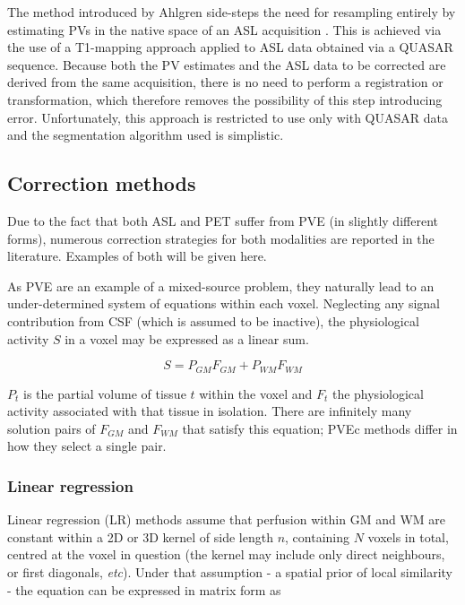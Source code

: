 \documentclass[12pt]{report}
\providecommand{\DIFaddend}{} %
\DeclareRobustCommand{\DIFaddend}{\DIFOaddend \let\includegraphics\DIFOincludegraphics} %
\begin{document}
\DIFaddend The method introduced by Ahlgren side-steps the need for resampling entirely by estimating PVs in the native space of an ASL acquisition \cite{Ahlgren2014}. This is achieved via the use of a T1-mapping approach applied to ASL data obtained via a QUASAR sequence. Because both the PV estimates and the ASL data to be corrected are derived from the same acquisition, there is no need to perform a registration or transformation, which therefore removes the possibility of this step introducing error. Unfortunately, this approach is restricted to use only with QUASAR data and the segmentation algorithm used is simplistic. 

\subsection{Correction methods}

Due to the fact that both ASL and PET suffer from PVE (in slightly different forms), numerous correction strategies for both modalities are reported in the literature. Examples of both will be given here. 

As PVE are an example of a mixed-source problem, they naturally lead to an under-determined system of equations within each voxel. Neglecting any signal contribution from CSF (which is assumed to be inactive), the physiological activity $S$ in a voxel may be expressed as a linear sum. 

\begin{equation}
S = P_{GM} F_{GM}+ P_{WM} F_{WM}
\end{equation} 

$P_t$ is the partial volume of tissue $t$ within the voxel and $F_{t}$ the physiological activity associated with that tissue in isolation. There are infinitely many solution pairs of $F_{GM}$ and $F_{WM}$ that satisfy this equation; PVEc methods differ in how they select a single pair.

\subsubsection{Linear regression}

Linear regression (LR) methods assume that perfusion within GM and WM are constant within a 2D or 3D kernel of side length $n$, containing $N$ voxels in total, centred at the voxel in question (the kernel may include only direct neighbours, or first diagonals, \textit{etc}). Under that assumption - a spatial prior of local similarity - the equation can be expressed in matrix form as
\end{document}
